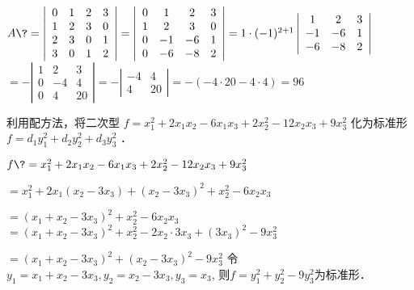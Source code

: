 \documentclass{njustexam}
\begin{document}
\begin{solution}
$A \? = \left|\begin{array}{cccc}
    0 & 1 & 2 & 3\\
    1 & 2 & 3 & 0\\
    2 & 3 & 0 & 1\\
    3 & 0 & 1 & 2
  \end{array}\right| = \left|\begin{array}{cccc}
    0 & 1 & 2 & 3\\
    1 & 2 & 3 & 0\\
    0 & - 1 & - 6 & 1\\
    0 & - 6 & - 8 & 2
  \end{array}\right| = 1 \cdot (- 1)^{2 + 1} \left|\begin{array}{ccc}
    1 & 2 & 3\\
    - 1 & - 6 & 1\\
    - 6 & - 8 & 2
  \end{array}\right|$ 
\+ $= -\left|\begin{array}{ccc}
    1 & 2 & 3\\
    0 & - 4 & 4\\
    0 & 4 & 20
  \end{array}\right| = - \left|\begin{array}{cc}
    - 4 & 4\\
    4 & 20
  \end{array}\right| = -(-4\cdot20-4\cdot4) = 96$ 
\end{solution}

\bigskip

\begin{problem}
利用配方法，将二次型 $f = x_1^2 + 2 x_1 x_2 - 6 x_1 x_3 + 2 x_2^2 - 12
x_2 x_3 + 9 x^2_3$ 化为标准形 $f = d_1 y^2_1 + d_2 y^2_2 + d_3 y^2_3$ ．
\end{problem}

\smallskip

\begin{solution}
$f \? = x_1^2 + 2 x_1 x_2 - 6 x_1 x_3 + 2 x_2^2 - 12 x_2 x_3 + 9 x^2_3$ \par
  \+ $= x_1^2 + 2 x_1 (x_2 - 3 x_3) + (x_2 - 3 x_3)^2 + x_2^2 - 6 x_2 x_3 $ \par
  \+ $= (x_1 + x_2 - 3 x_3)^2 + x_2^2 - 6 x_2 x_3$ 
  \+ $= (x_1 + x_2 - 3 x_3)^2 + x_2^2 - 2 x_2 \cdot 3 x_3 + (3 x_3)^2 - 9x_3^2$ \par
  \+ $= (x_1 + x_2 - 3 x_3)^2 + (x_2 - 3 x_3)^2 - 9 x_3^2$ 
令$y_1 = x_1 + x_2 - 3 x_3, y_2 = x_2 - 3 x_3, y_3 = x_3$, \newline
则$f = y_1^2 + y_2^2 - 9y_3^2$为标准形．
\end{solution}
\end{document}
